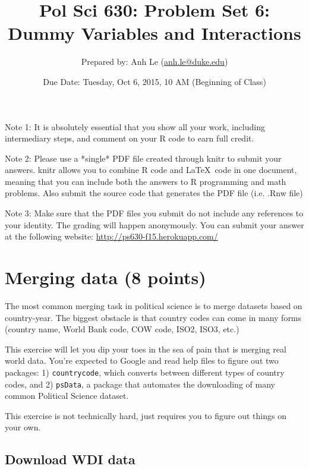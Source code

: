 \documentclass{article}\usepackage[]{graphicx}\usepackage[]{color}
\begin{document}
\title{Pol Sci 630:  Problem Set 6: Dummy Variables and Interactions}

\author{Prepared by: Anh Le (\href{mailto:anh.le@duke.edu}{anh.le@duke.edu})}

\date{Due Date: Tuesday, Oct 6, 2015, 10 AM (Beginning of Class)}

\maketitle

Note 1: It is absolutely essential that you show all your work, including intermediary steps, and comment on your R code to earn full credit.

Note 2: Please use a *single* PDF file created through knitr to submit your answers. knitr allows you to combine R code and \LaTeX \ code in one document, meaning that you can include both the answers to R programming and math problems. Also submit the source code that generates the PDF file (i.e. .Rnw file)

Note 3: Make sure that the PDF files you submit do not include any references to your identity. The grading will happen anonymously. You can submit your answer at the following website: \url{http://ps630-f15.herokuapp.com/}

\section{Merging data (8 points)}

The most common merging task in political science is to merge datasets based on country-year. The biggest obstacle is that country codes can come in many forms (country name, World Bank code, COW code, ISO2, ISO3, etc.)

This exercise will let you dip your toes in the sea of pain that is merging real world data. You're expected to Google and read help files to figure out two packages: 1) \verb`countrycode`, which converts between different types of country codes, and 2) \verb`psData`, a package that automates the downloading of many common Political Science dataset.

This exercise is not technically hard, just requires you to figure out things on your own.

\subsection{Download WDI data}
\end{document}
